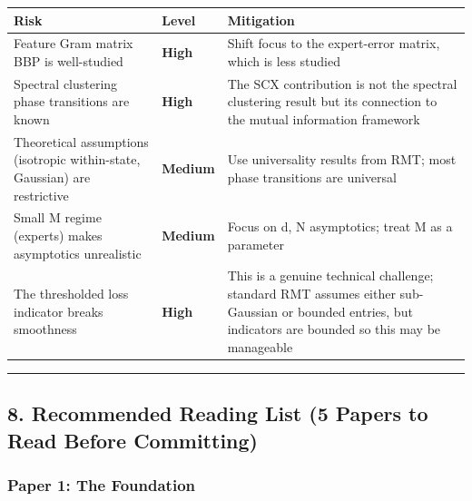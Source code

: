 \documentclass[
  12pt,
]{article}
\begin{document}
\begin{longtable}[]{@{}
  >{\raggedright\arraybackslash}p{}
  >{\raggedright\arraybackslash}p{}
  >{\raggedright\arraybackslash}p{}@{}}
\toprule\noalign{}
\begin{minipage}[b]{\linewidth}\raggedright
Risk
\end{minipage} & \begin{minipage}[b]{\linewidth}\raggedright
Level
\end{minipage} & \begin{minipage}[b]{\linewidth}\raggedright
Mitigation
\end{minipage} \\
\midrule\noalign{}
\endhead
\bottomrule\noalign{}
\endlastfoot
Feature Gram matrix BBP is well-studied & \textbf{High} & Shift focus to
the expert-error matrix, which is less studied \\
Spectral clustering phase transitions are known & \textbf{High} & The
SCX contribution is not the spectral clustering result but its
connection to the mutual information framework \\
Theoretical assumptions (isotropic within-state, Gaussian) are
restrictive & \textbf{Medium} & Use universality results from RMT; most
phase transitions are universal \\
Small M regime (experts) makes asymptotics unrealistic & \textbf{Medium}
& Focus on d, N asymptotics; treat M as a parameter \\
The thresholded loss indicator breaks smoothness & \textbf{High} & This
is a genuine technical challenge; standard RMT assumes either
sub-Gaussian or bounded entries, but indicators are bounded so this may
be manageable \\
\end{longtable}

\begin{center}\rule{0.5\linewidth}{0.5pt}\end{center}

\subsection{8. Recommended Reading List (5 Papers to Read Before
Committing)}\label{recommended-reading-list-5-papers-to-read-before-committing}

\subsubsection{Paper 1: The Foundation}\label{paper-1-the-foundation}
\end{document}
